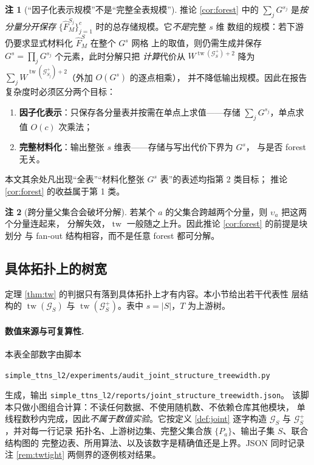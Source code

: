 \documentclass[a4paper,11pt]{article}
\theoremstyle{definition}
\newtheorem{remark}{注}
\newcommand{\1}{\mathbf 1}
\newcommand{\tw}{\operatorname{tw}}
\newcommand{\Gcal}{\mathcal G}
\begin{document}
\begin{remark}[“因子化表示规模”不是“完整全表规模”]
\label{rem:forestsize}
推论 \ref{cor:forest} 中的 $\sum_j G^{s_j}$ 是\emph{按分量分开保存}
$\{\widehat F^{S_j}_{M}\}_{j=1}^{c}$ 时的总存储规模。它\emph{不是}完整 $s$ 维
数组的规模：若下游仍要求显式材料化 $\widehat F^{S}_{M}$ 在整个 $G^{s}$ 网格
上的取值，则仍需生成并保存 $G^{s}=\prod_j G^{s_j}$ 个元素，此时分解只把
\emph{计算}代价从 $W^{\tw(\Gcal_S^{+})+2}$ 降为
$\sum_j W^{\tw(\Gcal_{S_j}^{+})+2}$（外加 $O(G^{s})$ 的逐点相乘），
并不降低输出规模。因此在报告复杂度时必须区分两个目标：
\begin{enumerate}
\item \textbf{因子化表示}：只保存各分量表并按需在单点上求值——存储
$\sum_j G^{s_j}$，单点求值 $O(c)$ 次乘法；
\item \textbf{完整材料化}：输出整张 $s$ 维表——存储与写出代价下界为 $G^{s}$，
与是否 forest 无关。
\end{enumerate}
本文其余处凡出现“全表”“材料化整张 $G^{s}$ 表”的表述均指第 2 类目标；
推论 \ref{cor:forest} 的收益属于第 1 类。
\end{remark}

\begin{remark}[跨分量父集合会破坏分解]
\label{rem:forestbreak}
若某个 $a$ 的父集合跨越两个分量，则 $\upsilon_a$ 把这两个分量连起来，
分解失效，$\tw$ 一般随之上升。因此推论 \ref{cor:forest} 的前提是块划分
与 fan-out 结构相容，而不是任意 forest 都可分解。
\end{remark}

\subsection{具体拓扑上的树宽}
\label{sec:twtable}

定理 \ref{thm:tw} 的判据只有落到具体拓扑上才有内容。本小节给出若干代表性
层结构的 $\tw(\Gcal_S)$ 与 $\tw(\Gcal_S^{+})$。表中 $s=|S|$，$T$ 为上游树。

\paragraph{数值来源与可复算性.}
本表全部数字由脚本
\begin{center}
\texttt{simple\_ttns\_l2/experiments/audit\_joint\_structure\_treewidth.py}
\end{center}
生成，输出 \texttt{simple\_ttns\_l2/reports/}\allowbreak\texttt{joint\_structure\_treewidth.json}。
该脚本只做小图组合计算：不读任何数据、不使用随机数、不依赖仓库其他模块，
单线程数秒内完成，因此\emph{不属于数值实验}。它按定义 \ref{def:joint}
逐字构造 $\Gcal_S$ 与 $\Gcal_S^{+}$，并对每一行记录
拓扑名、上游树边集、完整父集合族 $\{P_a\}$、输出子集 $S$、联合结构图的
完整边表、所用算法、以及该数字是精确值还是上界。JSON 同时记录注
\ref{rem:twtight} 两侧界的逐例核对结果。
\end{document}
